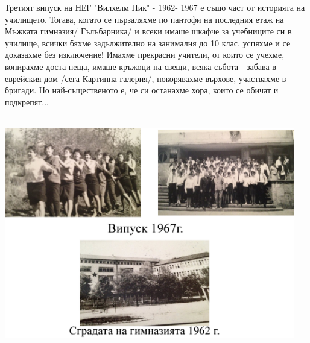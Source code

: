 \begin{multicols}{3}
Третият випуск на НЕГ "Вилхелм Пик" - 1962- 1967 е също част от историята на училището. Тогава, когато се пързаляхме по пантофи на последния етаж на Мъжката гимназия/ Гълъбарника/ и всеки имаше шкафче за учебниците си в училище, всички бяхме задължително на занималня до 10 клас, успяхме и се доказахме без изключение! 
Имахме прекрасни учители, от които се учехме, копирахме доста неща, 
имаше кръжоци на свещи, всяка събота - забава в еврейския дом /сега Картинна галерия/, покорявахме върхове, участвахме в бригади. Но най-същественото е, че си останахме хора, които се обичат и подкрепят... \\[19cm]
\\[1cm]


\hspace{-7cm}

\begin{center}
 \includegraphics[width=5in]{./treti_vipusk/3.jpg} 
\end{center}


\end{multicols}
